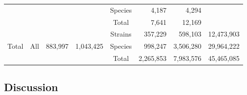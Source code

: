 \begin{table}
\begin{tabular}{@{}cccccrcr@{}}
      &  &  &  & Species & 4,187 & \multicolumn{1}{r}{4,294} & \multicolumn{1}{l}{} \\
      &  &  &  & Total & 7,641 & \multicolumn{1}{r}{12,169} & \multicolumn{1}{l}{} \\
      \multirow{3}{*}{Total} & \multirow{3}{*}{All} & \multirow{3}{*}{883,997} & \multirow{3}{*}{1,043,425} & Strains & 357,229 & \multicolumn{1}{r}{598,103} & 12,473,903 \\
      &  &  &  & Species & 998,247 & \multicolumn{1}{r}{3,506,280} & 29,964,222 \\
      &  &  &  & Total & 2,265,853 & \multicolumn{1}{r}{7,983,576} & 45,465,085 \\ \cmidrule(l){5-8} 
      \end{tabular}
   \end{table}




\subsection{Discussion}


